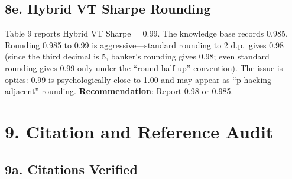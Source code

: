 \documentclass[12pt,a4paper]{article}
\begin{document}
\subsection*{8e. Hybrid VT Sharpe Rounding}

Table 9 reports Hybrid VT Sharpe = 0.99. The knowledge base records 0.985. Rounding 0.985 to 0.99 is aggressive---standard rounding to 2 d.p.\ gives 0.98 (since the third decimal is 5, banker's rounding gives 0.98; even standard rounding gives 0.99 only under the ``round half up'' convention). The issue is optics: 0.99 is psychologically close to 1.00 and may appear as ``p-hacking adjacent'' rounding. \textbf{Recommendation}: Report 0.98 or 0.985.

\bigskip

\section*{9. Citation and Reference Audit}

\subsection*{9a. Citations Verified}
\end{document}
